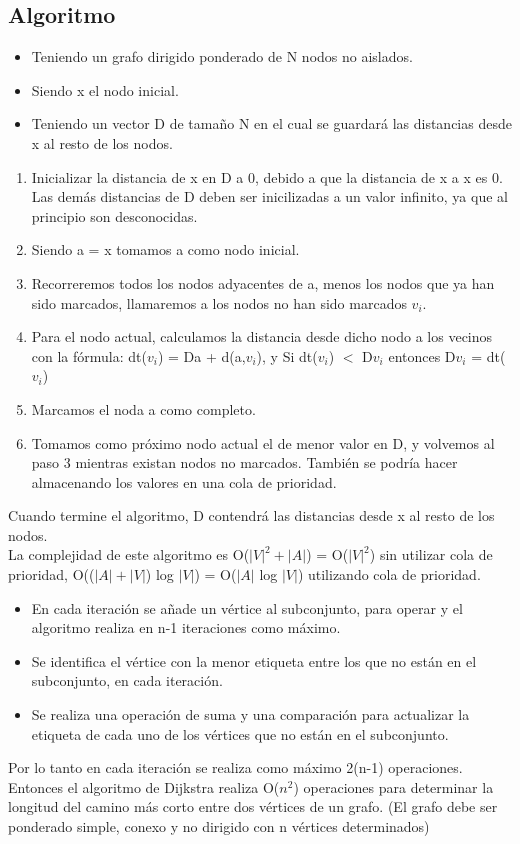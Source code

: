 \subsection{Algoritmo \cite{dijkstrabib}}\label{Explicacion-algoritmo-Dijkstra}
\begin{itemize}
\item
Teniendo un grafo dirigido ponderado de N nodos no aislados.
\item 
Siendo x el nodo inicial.
\item 
Teniendo un vector D de tamaño N en el cual se guardará las distancias desde x al resto de los nodos.
\end{itemize}

\begin{enumerate}
\item
Inicializar la distancia de x en D a 0, debido a que la distancia de x a x es 0. Las demás distancias de D deben ser inicilizadas a un valor infinito, ya que al principio son desconocidas.
\item
Siendo a = x tomamos a como nodo inicial.
\item
Recorreremos todos los nodos adyacentes de a, menos los nodos que ya han sido marcados, llamaremos a los nodos no han sido marcados $v_i$.
\item
Para el nodo actual, calculamos la distancia desde dicho nodo a los vecinos con la fórmula: dt($v_i$) = Da + d(a,$v_i$), y Si dt($v_i$) $<$ D$v_i$ entonces D$v_i$ = dt($v_i$)
\item
Marcamos el noda a como completo.
\item
Tomamos como próximo nodo actual el de menor valor en D, y volvemos al paso 3 mientras existan nodos no marcados. También se podría hacer almacenando los valores en una cola de prioridad.

\end{enumerate}

Cuando termine el algoritmo, D contendrá las distancias desde x al resto de los nodos.
\\
La complejidad de este algoritmo es O($|V|^2+|A|$) = O($|V|^2$) sin utilizar cola de prioridad, O(($|A|+|V|$) log $|V|$) = O($|A|$ log $|V|$) utilizando cola de prioridad.

\begin{itemize}
\item
En cada iteración se añade un vértice al subconjunto, para operar y el algoritmo realiza en n-1 iteraciones como máximo.
\item
Se identifica el vértice con la menor etiqueta entre los que no están en el subconjunto, en cada iteración.
\item
Se realiza una operación de suma y una comparación para actualizar la etiqueta de cada uno de los vértices que no están en el subconjunto.

\end{itemize}

Por lo tanto en cada iteración se realiza como máximo 2(n-1) operaciones. Entonces el algoritmo de Dijkstra realiza O($n^2$) operaciones para determinar la longitud del camino más corto entre dos vértices de un grafo. (El grafo debe ser ponderado simple, conexo y no dirigido con n vértices determinados)


